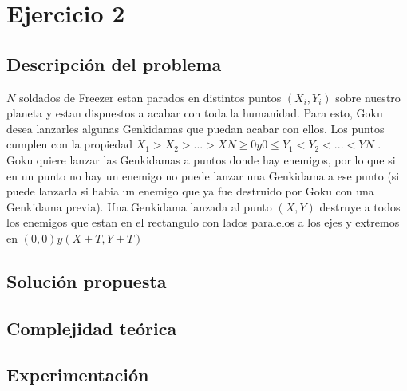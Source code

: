\section{Ejercicio 2}
    \subsection{Descripción del problema}
        $N$ soldados de Freezer estan parados en distintos puntos $(X_i,Y_i)$ sobre nuestro planeta y estan dispuestos a acabar con toda la humanidad. Para esto, Goku desea lanzarles algunas Genkidamas que puedan acabar con ellos. Los puntos cumplen con la propiedad $ X_1 > X_2 >
        . . . > X N ≥ 0 y 0 ≤ Y_1 < Y_2 < . . . < Y N$ . Goku quiere lanzar las Genkidamas a puntos donde hay enemigos, por lo que si en un punto no hay un enemigo no puede lanzar una Genkidama a ese punto (si puede lanzarla si habia un enemigo que ya fue destruido por Goku con una Genkidama previa). Una Genkidama lanzada al punto $(X,Y)$ destruye a todos los enemigos que estan en el rectangulo con lados paralelos a los ejes y extremos en $(0, 0) y (X + T, Y + T )$
    \subsection{Solución propuesta}
       
    \subsection{Complejidad teórica}
         
       


    \subsection{Experimentación}
